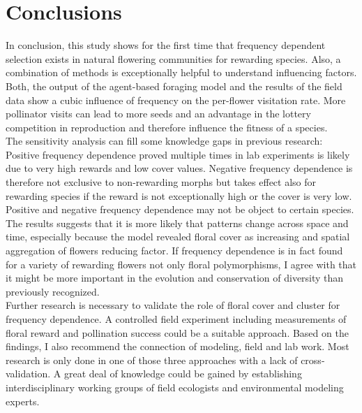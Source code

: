\section{Conclusions}
\label{ch:conclusions}
In conclusion, this study shows for the first time that frequency dependent selection exists in natural flowering communities for rewarding species. Also, a combination of methods is exceptionally helpful to understand influencing factors. Both, the output of the agent-based foraging model and the results of the field data show a cubic influence of frequency on the per-flower visitation rate. More pollinator visits can lead to more seeds and an advantage in the lottery competition in reproduction and therefore influence the fitness of a species. \\
The sensitivity analysis can fill some knowledge gaps in previous research: Positive frequency dependence proved multiple times in lab experiments is likely due to very high rewards and low cover values. Negative frequency dependence is therefore not exclusive to non-rewarding morphs but takes effect also for rewarding species if the reward is not exceptionally high or the cover is very low. \\
Positive and negative frequency dependence may not be object to certain species. The results suggests that it is more likely that patterns change across space and time, especially because the model revealed floral cover as increasing and spatial aggregation of flowers reducing factor. If frequency dependence is in fact found for a variety of rewarding flowers not only floral polymorphisms, I agree with \cite{Eckhart2006frequency} that it might be more important in the evolution and conservation of diversity than previously recognized.\\
Further research is necessary to validate the role of floral cover and cluster for frequency dependence. A controlled field experiment including measurements of floral reward and pollination success could be a suitable approach. Based on the findings, I also recommend the connection of modeling, field and lab work. Most research is only done in one of those three approaches with a lack of cross-validation. A great deal of knowledge could be gained by establishing interdisciplinary working groups of field ecologists and environmental modeling experts. \\